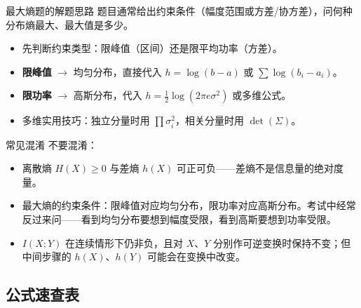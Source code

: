 \begin{methodBox}{最大熵题的解题思路}
题目通常给出约束条件（幅度范围或方差/协方差），问何种分布熵最大、最大值是多少。
\begin{itemize}
  \item 先判断约束类型：限峰值（区间）还是限平均功率（方差）。
  \item \textbf{限峰值} $\to$ 均匀分布，直接代入 $h=\log(b-a)$ 或 $\sum\log(b_i-a_i)$。
  \item \textbf{限功率} $\to$ 高斯分布，代入 $h=\frac{1}{2}\log(2\pi e\sigma^2)$ 或多维公式。
  \item 多维实用技巧：独立分量时用 $\prod\sigma_i^2$，相关分量时用 $\det(\Sigma)$。
\end{itemize}
\end{methodBox}

\begin{warningBox}{常见混淆}
不要混淆：
\begin{itemize}
  \item 离散熵 $H(X)\ge 0$ 与差熵 $h(X)$ 可正可负——差熵不是信息量的绝对度量。
  \item 最大熵的约束条件：限峰值对应均匀分布，限功率对应高斯分布。考试中经常反过来问——看到均匀分布要想到幅度受限，看到高斯要想到功率受限。
  \item $I(X;Y)$ 在连续情形下仍非负，且对 $X$、$Y$ 分别作可逆变换时保持不变；但中间步骤的 $h(X)$、$h(Y)$ 可能会在变换中改变。
\end{itemize}
\end{warningBox}

\subsection{公式速查表}

